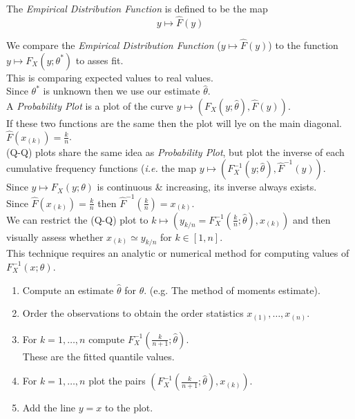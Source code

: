 \documentclass[11pt,a4paper]{article}
\begin{document}
The \textit{Empirical Distribution Function} is defined to be the map
$$y\mapsto\hat{F}(y)$$

We compare the \textit{Empirical Distribution Function} ($y\mapsto\hat{F}(y)$) to the function $y\mapsto F_X(y;\theta^*)$ to asses fit.\\
This is comparing expected values to real values.\\
Since $\theta^*$ is unknown then we use our estimate $\hat{\theta}$.\\

A \textit{Probability Plot} is a plot of the curve $y\mapsto(F_X(y;\hat{\theta}),\hat{F}(y))$.\\
If these two functions are the same then the plot will lye on the main diagonal.\\
\nb $\hat{F}(x_{(k)})=\frac{k}{n}$.\\

(Q-Q) plots share the same idea as \textit{Probability Plot}, but plot the inverse of each cumulative frequency functions (\textit{i.e.} the map $y\mapsto(F_X^{-1}(y;\hat{\theta}),\hat{F}^{-1}(y))$.\\
\nb Since $y\mapsto F_X(y;\theta)$ is continuous \& increasing, its inverse always exists.\\

Since $\hat{F}(x_{(k)})=\frac{k}{n}$ then $\hat{F}^{-1}(\frac{k}{n})=x_{(k)}$.\\
We can restrict the (Q-Q) plot to $k\mapsto(y_{k/n}=F_X^{-1}(\frac{k}{n};\hat{\theta}),x_{(k)})$ and then visually assess whether $x_{(k)}\simeq y_{k/n}$ for $k\in[1,n]$.\\

This technique requires an analytic or numerical method for computing values of $F_X^{-1}(x;\theta)$.
\begin{enumerate}[label=\roman*)]
	\item Compute an estimate $\hat{\theta}$ for $\theta$. (e.g. The method of moments estimate).
	\item Order the observations to obtain the order statistics $x_{(1)},\dots,x_{(n)}$.
	\item For $k=1,\dots,n$ compute $F_X^{-1}\left(\frac{k}{n+1};\hat{\theta}\right)$.\\
	\nb	These are the fitted quantile values.
	\item For $k=1,\dots,n$ plot the pairs $\left(F_X^{-1}\left(\frac{k}{n+1};\hat{\theta}\right),x_{(k)}\right)$.
	\item Add the line $y=x$ to the plot.
\end{enumerate}
\end{document}
